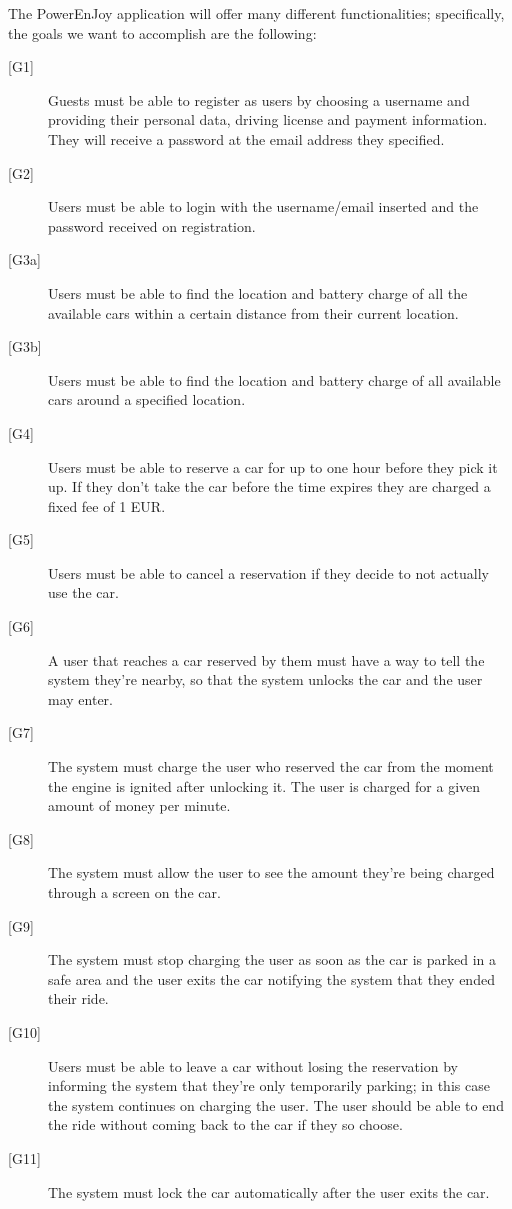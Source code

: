 \documentclass[english]{article}
\begin{document}
The PowerEnJoy application will offer many different functionalities; specifically, the goals we want to accomplish are the following:
\begin{description}
	\item[{[G1]}]{Guests must be able to register as users by choosing a username and providing their personal data, driving license and payment information. They will receive a password at the email address they specified.}
	\item[{[G2]}]{Users must be able to login with the username/email inserted and the password received on registration.}
	\item[{[G3a]}]{Users must be able to find the location and battery charge of all the available cars within a certain distance from their current location.}
	\item[{[G3b]}]{Users must be able to find the location and battery charge of all available cars around a specified location.}
	\item[{[G4]}]{Users must be able to reserve a car for up to one hour before they pick it up. If they don't take the car before the time expires they are charged a fixed fee of 1 EUR.}
	\item[{[G5]}]{Users must be able to cancel a reservation if they decide to not actually use the car.}
	\item[{[G6]}]{A user that reaches a car reserved by them must have a way to tell the system they’re nearby, so that the system unlocks the car and the user may enter.}
	\item[{[G7]}]{The system must charge the user who reserved the car from the moment the engine is ignited after unlocking it. The user is charged for a given	amount of money per minute.}
	\item[{[G8]}]{The system must allow the user to see the amount they’re being charged through a screen on the car.}
	\item[{[G9]}]{The system must stop charging the user as soon as the car is parked in a safe area and the user exits the car notifying the system that they ended their ride.}
	\item[{[G10]}]{Users must be able to leave a car without losing the reservation by informing the system that they’re only temporarily parking; in this case the system continues on charging the user. The user should be able to end the ride without coming back to the car if they so choose.}
	\item[{[G11]}]{The system must lock the car automatically after the user exits the car.}

\end{description}
\end{document}
